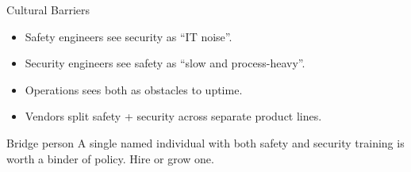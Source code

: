 \documentclass[aspectratio=169,11pt]{beamer}
\begin{document}
\begin{frame}{Cultural Barriers}
\begin{itemize}
  \item Safety engineers see security as ``IT noise''.
  \item Security engineers see safety as ``slow and process-heavy''.
  \item Operations sees both as obstacles to uptime.
  \item Vendors split safety + security across separate product lines.
\end{itemize}
\begin{tipbox}{Bridge person}
A single named individual with both safety and security training is worth a binder of policy. Hire or grow one.
\end{tipbox}
\end{frame}
\end{document}
